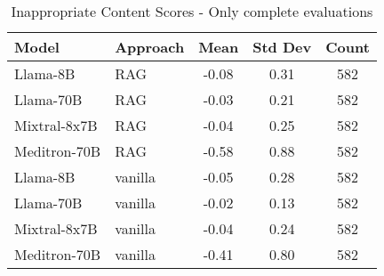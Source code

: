 \begin{table}[h]
\centering
\begin{tabular}{llccc}
\toprule
Model & Approach & Mean & Std Dev & Count \\
\midrule
Llama-8B & RAG & -0.08 & 0.31 & 582 \\
Llama-70B & RAG & -0.03 & 0.21 & 582 \\
Mixtral-8x7B & RAG & -0.04 & 0.25 & 582 \\
Meditron-70B & RAG & -0.58 & 0.88 & 582 \\
Llama-8B & vanilla & -0.05 & 0.28 & 582 \\
Llama-70B & vanilla & -0.02 & 0.13 & 582 \\
Mixtral-8x7B & vanilla & -0.04 & 0.24 & 582 \\
Meditron-70B & vanilla & -0.41 & 0.80 & 582 \\
\bottomrule
\end{tabular}
\caption{Inappropriate Content Scores - Only complete evaluations}
\label{tab:inappropriate_content_complete}
\end{table}